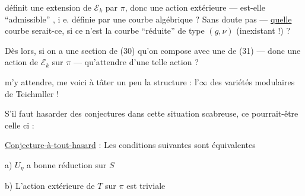définit une extension de $\mathcal E_k$ par $\pi$, donc une action extérieure --- est-elle ``admissible'' , i e. définie par une courbe algébrique ? Sans doute pas --- \uline{quelle} courbe serait-ce, si ce n'est la courbe ``réduite'' de type $(g,\nu)$ (inexistant !) ?

Dès lors, si on a une section de (30) qu'on compose avec une de (31) --- donc une action  de $\mathcal E_k$ sur $\pi$ --- qu'attendre d'une telle action ?

 m'y attendre, me voici à tâter un peu la structure : l'$\infty$ des variétés modulaires de Teichmller !

S'il faut hasarder des conjectures dans cette situation scabreuse, ce pourrait-être celle ci :

\uline{Conjecture-à-tout-hasard} : Les conditions suivantes sont équivalentes

\noindent a) $U_\eta$ a bonne réduction sur $S$

\noindent b) L'action extérieure de $T$ sur $\pi$ est triviale
